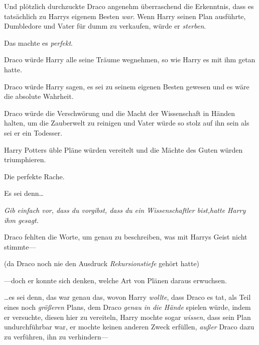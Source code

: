 Und plötzlich durchzuckte Draco angenehm überraschend die Erkenntnis, dass es tatsächlich zu Harrys eigenem Besten \emph{war}. Wenn Harry seinen Plan ausführte, Dumbledore und Vater für dumm zu verkaufen, würde er \emph{sterben}.

Das machte es \emph{perfekt}.

Draco würde Harry alle seine Träume wegnehmen, so wie Harry es mit ihm getan hatte.

Draco würde Harry sagen, es sei zu seinem eigenen Besten gewesen und es wäre die absolute Wahrheit.

Draco würde die Verschwörung und die Macht der Wissenschaft in Händen halten, um die Zauberwelt zu reinigen und Vater würde so stolz auf ihn sein als sei er ein Todesser.

Harry Potters üble Pläne würden vereitelt und die Mächte des Guten würden triumphieren.

Die perfekte Rache.

Es sei denn…

\emph{Gib einfach vor, dass du vorgibst, dass du ein Wissenschaftler bist,hatte Harry ihm gesagt.}

Draco fehlten die Worte, um genau zu beschreiben, was mit Harrys Geist nicht stimmte—

(da Draco noch nie den Ausdruck \emph{Rekursionstiefe} gehört hatte)

—doch er konnte sich denken, welche Art von Plänen daraus erwuchsen.

…es sei denn, das war genau das, wovon Harry \emph{wollte}, dass Draco es tat, als Teil eines noch \emph{größeren} Plans, dem Draco \emph{genau in die Hände} spielen würde, indem er versuchte, diesen hier zu vereiteln, Harry mochte sogar \emph{wissen}, dass sein Plan undurchführbar war, er mochte keinen anderen Zweck erfüllen, \emph{außer} Draco dazu zu verführen, ihn zu verhindern—

